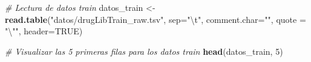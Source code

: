\documentclass[spanish,]{article}
\newenvironment{Shaded}{\begin{snugshade}}{\end{snugshade}}
\newcommand{\KeywordTok}[1]{\textcolor[rgb]{0.13,0.29,0.53}{\textbf{#1}}}
\newcommand{\DataTypeTok}[1]{\textcolor[rgb]{0.13,0.29,0.53}{#1}}
\newcommand{\DecValTok}[1]{\textcolor[rgb]{0.00,0.00,0.81}{#1}}
\newcommand{\CharTok}[1]{\textcolor[rgb]{0.31,0.60,0.02}{#1}}
\newcommand{\StringTok}[1]{\textcolor[rgb]{0.31,0.60,0.02}{#1}}
\newcommand{\CommentTok}[1]{\textcolor[rgb]{0.56,0.35,0.01}{\textit{#1}}}
\newcommand{\OtherTok}[1]{\textcolor[rgb]{0.56,0.35,0.01}{#1}}
\newcommand{\NormalTok}[1]{#1}
\begin{document}
\begin{Shaded}
\begin{Highlighting}[]
\CommentTok{# Lectura de datos train}
\NormalTok{datos_train <-}\StringTok{ }\KeywordTok{read.table}\NormalTok{(}\StringTok{"datos/drugLibTrain_raw.tsv"}\NormalTok{, }\DataTypeTok{sep=}\StringTok{"}\CharTok{\textbackslash{}t}\StringTok{"}\NormalTok{, }\DataTypeTok{comment.char=}\StringTok{""}\NormalTok{,}
                          \DataTypeTok{quote =} \StringTok{"}\CharTok{\textbackslash{}"}\StringTok{"}\NormalTok{, }\DataTypeTok{header=}\OtherTok{TRUE}\NormalTok{)}
\end{Highlighting}
\end{Shaded}

\begin{Shaded}
\begin{Highlighting}[]
\CommentTok{# Visualizar las 5 primeras filas para los datos train}
\KeywordTok{head}\NormalTok{(datos_train, }\DecValTok{5}\NormalTok{) }
\end{Highlighting}
\end{Shaded}
\end{document}
